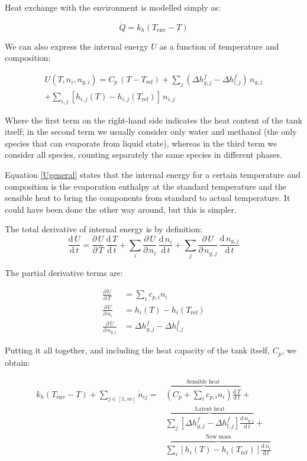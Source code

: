 \documentclass[a4paper]{article}
\renewcommand{\d}{\ensuremath{\mathrm{d}}}
\newcommand{\der}[2]{\ensuremath{\frac{\d \, #1}{\d \, #2}}}
\newcommand{\pder}[2]{\ensuremath{\frac{\partial \, #1}{\partial \, #2}}}
\begin{document}
Heat exchange with the environment is modelled simply as:

\begin{equation}
\dot Q = k_h ( T_\text{env} - T )
\end{equation}

We can also express the internal energy $U$ as a function of temperature and
composition:

\begin{multline}
\label{Ugeneral}
U(T, n_i, n_{g,i}) = C_p \, ( T - T_\text{ref} ) +
\sum_j \left (\Delta h _{g,j}^f - \Delta h _{l,j}^f \right) \, n_{g,j} \\
+ \sum_{i,j} [ h_{i,j}(T) - h_{i,j}(T_\text{ref})] \, n_{i,j}
\end{multline}


Where the first term on the right-hand side indicates the heat content of the
tank itself; in the second term we usually consider only water
and methanol (the only species that can evaporate from liquid state), whereas
in the third term we consider all species, counting separately the same species
in different phases.

Equation \ref{Ugeneral} states that the internal energy for a certain
temperature and composition is the evaporation enthalpy at the standard
temperature and the sensible heat to bring the components from standard to
actual temperature. It could have been done the other way around, but this is
simpler.

The total derivative of internal energy is by definition:
\begin{equation}
\label{totalDerU}
\der{U}{t} = \pder{U}{T}\,\der{T}{t} + \sum_i \pder{U}{n_i}\,\der{n_i}{t} +
\sum_j \pder{U}{n_{g,j}}\,\der{n_{g,j}}{t}
\end{equation}

The partial derivative terms are:

\begin{align}
\pder{U}{T} & = \sum_i c_{p,i} n_i\\
\pder{U}{n_i} & = h_i(T) - h_i(T_\text{ref})\\
\pder{U}{n_{g,j}} & = \Delta h _{g,j}^f - \Delta h _{l,j}^f
\end{align}

Putting it all together, and including the heat capacity of the tank itself,
$C_p$, we obtain:

\begin{equation}
\boxed{ \begin{aligned}
k_h ( T_\text{env} - T ) + \sum_{j \in [1, m]} \dot n_{ij} = &
\overbrace{\left ( C_p + \sum_i c_{p,i} n_i \right) \der{T}{t} }
^\text{Sensible heat} +\\
& \overbrace{\sum_j [ \Delta h _{g,j}^f - \Delta h _{l,j}^f ] \der{n_{g,j}}{t}}
^\text{Latent heat} +\\
& \overbrace{ \sum_i [ h_i(T) - h_i(T_\text{ref}) ] \der{n_i}{t} }
^\text{New mass}
\end{aligned} }
\end{equation}
\end{document}
